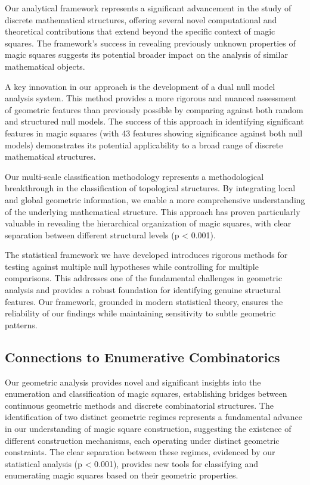 Our analytical framework represents a significant advancement in the study of discrete mathematical structures, offering several novel computational and theoretical contributions that extend beyond the specific context of magic squares. The framework's success in revealing previously unknown properties of magic squares suggests its potential broader impact on the analysis of similar mathematical objects.

A key innovation in our approach is the development of a dual null model analysis system. This method provides a more rigorous and nuanced assessment of geometric features than previously possible by comparing against both random and structured null models. The success of this approach in identifying significant features in magic squares (with 43 features showing significance against both null models) demonstrates its potential applicability to a broad range of discrete mathematical structures.

Our multi-scale classification methodology represents a methodological breakthrough in the classification of topological structures. By integrating local and global geometric information, we enable a more comprehensive understanding of the underlying mathematical structure. This approach has proven particularly valuable in revealing the hierarchical organization of magic squares, with clear separation between different structural levels (p < 0.001).

The statistical framework we have developed introduces rigorous methods for testing against multiple null hypotheses while controlling for multiple comparisons. This addresses one of the fundamental challenges in geometric analysis and provides a robust foundation for identifying genuine structural features. Our framework, grounded in modern statistical theory, ensures the reliability of our findings while maintaining sensitivity to subtle geometric patterns.

\subsection{Connections to Enumerative Combinatorics}
\label{subsec:combinatorics}

Our geometric analysis provides novel and significant insights into the enumeration and classification of magic squares, establishing bridges between continuous geometric methods and discrete combinatorial structures. The identification of two distinct geometric regimes represents a fundamental advance in our understanding of magic square construction, suggesting the existence of different construction mechanisms, each operating under distinct geometric constraints. The clear separation between these regimes, evidenced by our statistical analysis (p < 0.001), provides new tools for classifying and enumerating magic squares based on their geometric properties.

